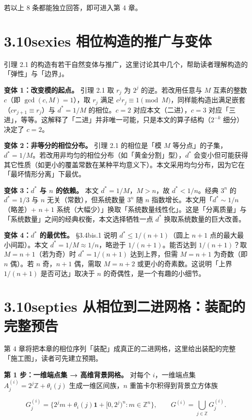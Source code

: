 \documentclass[a4paper,11pt,openany]{ctexbook}
\numberwithin{equation}{chapter}
\numberwithin{figure}{chapter}
\numberwithin{table}{chapter}
\begin{document}
若以上 8 条都能独立回答，即可进入第 4 章。

\section{3.10sexies 相位构造的推广与变体}

引理 2.1 的构造有若干自然变体与推广，这里讨论其中几个，帮助读者理解构造的「弹性」与「边界」。

\textbf{变体 1：改变模的起点。} 引理 2.1 取 $r_j$ 为 $2^j$ 的逆。若改用任意与 $M$ 互素的整数 $c$（即 $\gcd(c,M)=1$），取 $r_j$ 满足 $c^j r_j\equiv1\pmod M$，同样能构造出满足嵌套（$cr_{j+1}\equiv r_j$）与 $d^*=1/M$ 的相位。$c=2$ 对应本文（二进），$c=3$ 对应「三进」，等等。这解释了「二进」并非唯一可能，只是本文的算子结构（$2^{-k}$ 细分）决定了 $c=2$。

\textbf{变体 2：非等分的相位分布。} 引理 2.1 的相位是「模 $M$ 等分点」的子集，$d^*=1/M$。若改用非均匀的相位分布（如「黄金分割」型），$d^*$ 会变小但可能获得其它性质（如更小的覆盖常数在某种平均意义下）。本文采用均匀分布，因为它在「最坏情形分离」下最优。

\textbf{变体 3：$d^*$ 与 $n$ 的依赖。} 本文 $d^*=1/M$，$M>n$，故 $d^*<1/n$。经典 $3^n$ 的 $d^*=1/3$ 与 $n$ 无关（常数），但系统数量 $3^n$ 随 $n$ 指数增长。本文用「$d^*\sim1/n$（略差）+ $n+1$ 系统（大幅少）」换取「系统数量线性化」。这是「分离质量」与「系统数量」之间的经典权衡，本文选择牺牲一点 $d^*$ 换取系统数量的巨大改善。

\textbf{变体 4：$d^*$ 的最优性。} §3.4bis.1 说明 $d^*\le1/(n+1)$（圆上 $n+1$ 点的最大最小间距）。本文 $d^*=1/M\approx1/n$，略逊于 $1/(n+1)$。能否达到 $1/(n+1)$？取 $M=n+1$（若为奇）时 $d^*=1/(n+1)$ 达到上界，但需 $M=n+1$ 为奇数（即 $n$ 偶）。若 $n$ 奇，$n+1$ 偶，需取 $M=n+2$ 或更小的奇素数。这说明「上界 $1/(n+1)$ 是否可达」取决于 $n$ 的奇偶性，是一个有趣的小细节。

\section{3.10septies 从相位到二进网格：装配的完整预告}

第 4 章将把本章的相位序列「装配」成真正的二进网格，这里给出装配的完整「施工图」，读者可先建立预期。

\textbf{第 1 步：一维端点集 → 高维背景网格。} 对每个 $i$，一维端点集 $A_j^{(i)}=2^j\mathbb Z+\theta_i(j)$ 生成一维区间族，$n$ 重笛卡尔积得到背景立方体族

$$G_j^{(i)}=\{2^j m+\theta_i(j)\mathbf1+[0,2^j)^n:m\in\mathbb Z^n\},\qquad G^{(i)}=\bigcup_{j\in\mathbb Z}G_j^{(i)}.$$
\end{document}
